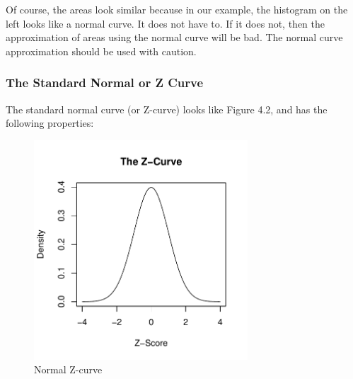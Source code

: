 \documentclass[11pt, chapterprefix=true]{scrbook}\usepackage[]{graphicx}\usepackage[]{color}
\begin{document}
Of course, the areas look similar because in our example, the histogram on the left
looks like a normal curve.  It does not have to.  If it does not, then the approximation of areas using the normal curve will be bad.  The normal curve approximation should be used with caution.

\subsubsection{The Standard Normal or Z Curve}

The standard normal curve (or Z-curve) looks like Figure 4.2, and has the following properties:

\begin{center}
\end{center}

\begin{figure}[ht]
\caption{Normal Z-curve}



{\centering \includegraphics[width=8cm]{figure/LBL4b-1} 

}



\end{figure}
\end{document}
